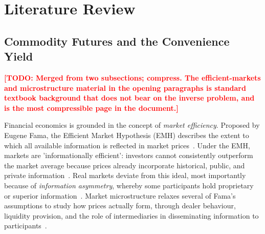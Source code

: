 \documentclass[11pt, a4paper]{article}
\newcommand{\todo}[1]{\textcolor{red}{\textbf{[TODO: #1]}}}
\begin{document}




\section{Literature Review}
\label{sec:literature}

\subsection{Commodity Futures and the Convenience Yield}
\label{sec:fin_fun}
\label{sec:lit_commodity_merged}
\todo{Merged from two subsections; compress. The efficient-markets and
  microstructure material in the opening paragraphs is standard textbook
  background that does not bear on the inverse problem, and is the most
  compressible page in the document.}

Financial economics is grounded in the concept of \textit{market efficiency}. Proposed by Eugene Fama, the Efficient Market Hypothesis (EMH) describes the extent to which all available information is reflected in market prices~\cite{Fama1970EfficientWork, ShivakumarGT.2018TheEfficieny}. Under the EMH, markets are 'informationally efficient': investors cannot consistently outperform the market average because prices already incorporate historical, public, and private information~\cite{ShivakumarGT.2018TheEfficieny}. Real markets deviate from this ideal, most importantly because of \textit{information asymmetry}, whereby some participants hold proprietary or superior information~\cite{ShivakumarGT.2018TheEfficieny}. Market microstructure relaxes several of Fama's assumptions to study how prices actually form, through dealer behaviour, liquidity provision, and the role of intermediaries in disseminating information to participants~\cite{deJong2009Introduction}.
\end{document}
